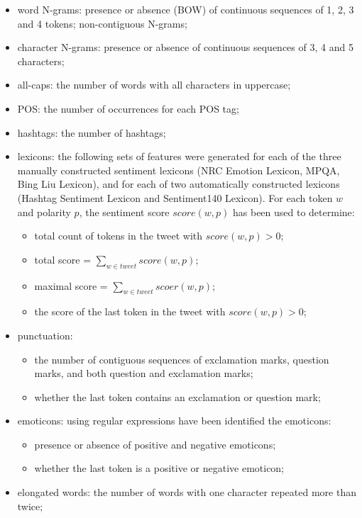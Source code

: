 \begin{itemize}
	\item word N-grams: presence or absence (\ac{BOW}) of continuous sequences of 1, 2, 3 and 4 tokens; non-contiguous N-grams;
	\item character N-grams: presence or absence of continuous sequences of 3, 4 and 5 characters;
	\item all-caps: the number of words with all characters in uppercase;
	\item \ac{POS}: the number of occurrences for each \acl{POS} tag;
	\item hashtags: the number of hashtags;
	\item lexicons: the following sets of features were generated for each of the three manually constructed sentiment lexicons (NRC Emotion Lexicon, MPQA, Bing Liu Lexicon), and for each of two automatically constructed lexicons (Hashtag Sentiment Lexicon and Sentiment140 Lexicon). For each token $w$ and polarity $p$, the sentiment score $score(w,p)$ has been used to determine:
	\begin{itemize}
		\item total count of tokens in the tweet with $score(w,p)>0$;
		\item total score = $\sum_{w \in tweet} score(w,p)$;
		\item maximal score = $\sum_{w \in tweet} scoer(w,p)$;
		\item the score of the last token in the tweet with $score(w,p)>0$;
	\end{itemize}
	\item punctuation:
	\begin{itemize}
		\item the number of contiguous sequences of exclamation marks, question marks, and both question and exclamation marks;
		\item whether the last token contains an exclamation or question mark;
	\end{itemize}
	\item emoticons: using regular expressions have been  identified the emoticons:
	\begin{itemize}
		\item presence or absence of positive and negative emoticons;
		\item whether the last token is a positive or negative emoticon;
	\end{itemize}
	\item elongated words: the number of words with one character repeated more than twice;

\end{itemize}
